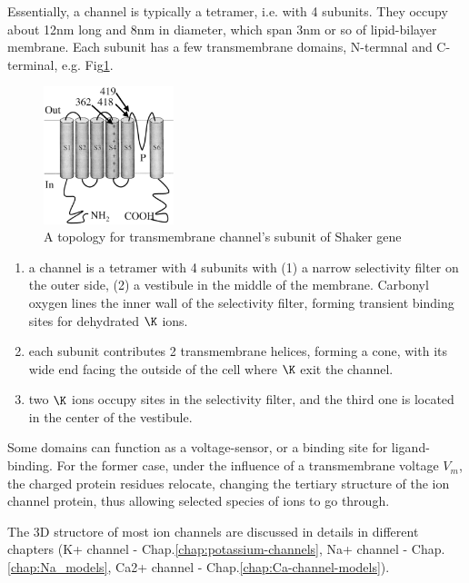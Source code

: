 Essentially, a  channel is typically a tetramer, i.e. with 4 subunits. They
occupy about 12nm long and 8nm in diameter, which span 3nm or so of
lipid-bilayer membrane. Each subunit has a few transmembrane domains, N-termnal
and C-terminal, e.g.
Fig\ref{fig:Shaker_gene}.

\begin{figure}[hbt]
  \centerline{\includegraphics[height=4cm,
    angle=0]{./images/Shaker_gene.eps}}
  \caption{A topology for transmembrane channel's subunit of Shaker gene}
\label{fig:Shaker_gene}
\end{figure}

\begin{enumerate}
  \item a channel is a tetramer with 4 subunits with (1) a narrow
    selectivity filter on the outer side, (2) a vestibule in the
    middle of the membrane. Carbonyl oxygen lines the inner wall of
    the selectivity filter, forming transient binding sites for
    dehydrated $\K$ ions.

  \item each subunit contributes 2 transmembrane helices, forming a
    cone, with its wide end facing the outside of the cell where $\K$
    exit the channel.
  \item two $\K$ ions occupy sites in the selectivity filter, and the
    third one is located in the center of the vestibule.
\end{enumerate}

Some domains can function as a voltage-sensor, or a binding site for
ligand-binding. For the former case, under the influence of a transmembrane
voltage $V_m$, the charged protein residues relocate, changing the tertiary
structure of the ion channel protein, thus allowing selected species of ions to
go through.

The 3D structore of most ion channels are discussed in details in different
chapters (K+ channel - Chap.\ref{chap:potassium-channels}, Na+ channel -
Chap.\ref{chap:Na_models}, Ca2+ channel - Chap.\ref{chap:Ca-channel-models}).

